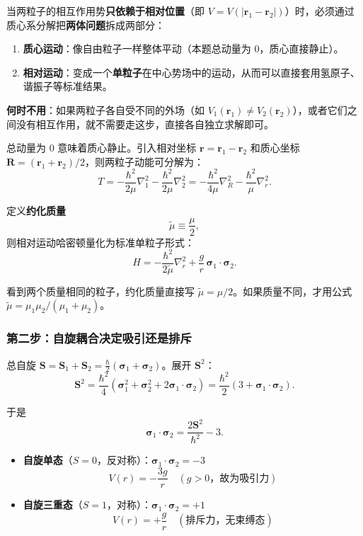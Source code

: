 \begin{insightbox}[什么时候必须用质心系分解？]
当两粒子的相互作用势\textbf{只依赖于相对位置}（即 $V = V(|\bm{r}_1 - \bm{r}_2|)$）时，必须通过质心系分解把\textbf{两体问题}拆成两部分：
\begin{enumerate}[nosep]
    \item \textbf{质心运动}：像自由粒子一样整体平动（本题总动量为 $0$，质心直接静止）。
    \item \textbf{相对运动}：变成一个\textbf{单粒子}在中心势场中的运动，从而可以直接套用氢原子、谐振子等标准结果。
\end{enumerate}
\textbf{何时不用}：如果两粒子各自受不同的外场（如 $V_1(\bm{r}_1) \neq V_2(\bm{r}_2)$），或者它们之间没有相互作用，就不需要走这步，直接各自独立求解即可。
\end{insightbox}

总动量为 $0$ 意味着质心静止。引入相对坐标 $\bm{r} = \bm{r}_1 - \bm{r}_2$ 和质心坐标 $\bm{R} = (\bm{r}_1 + \bm{r}_2)/2$，则两粒子动能可分解为：
\[
T = -\frac{\hbar^2}{2\mu}\nabla_1^2 - \frac{\hbar^2}{2\mu}\nabla_2^2
= -\frac{\hbar^2}{4\mu}\nabla_R^2 - \frac{\hbar^2}{\mu}\nabla_r^2.
\]

定义\textbf{约化质量}
\[
\tilde{\mu} \equiv \frac{\mu}{2},
\]
则相对运动哈密顿量化为标准单粒子形式：
\[
H = -\frac{\hbar^2}{2\tilde{\mu}} \nabla_r^2 + \frac{g}{r} \, \bm{\sigma}_1 \cdot \bm{\sigma}_2.
\]

\begin{tipbox}[考场速记]
看到两个质量相同的粒子，约化质量直接写 $\tilde{\mu}=\mu/2$。如果质量不同，才用公式 $\tilde{\mu}=\mu_1\mu_2/(\mu_1+\mu_2)$。
\end{tipbox}

\subsubsection{第二步：自旋耦合决定吸引还是排斥}

总自旋 $\bm{S} = \bm{S}_1 + \bm{S}_2 = \frac{\hbar}{2}(\bm{\sigma}_1 + \bm{\sigma}_2)$。展开 $\bm{S}^2$：
\[
\bm{S}^2 = \frac{\hbar^2}{4}(\bm{\sigma}_1^2 + \bm{\sigma}_2^2 + 2\bm{\sigma}_1 \cdot \bm{\sigma}_2) = \frac{\hbar^2}{2}(3 + \bm{\sigma}_1 \cdot \bm{\sigma}_2).
\]

于是
\[
\boxed{\bm{\sigma}_1 \cdot \bm{\sigma}_2 = \frac{2\bm{S}^2}{\hbar^2} - 3}.
\]

\begin{itemize}[nosep]
    \item \textbf{自旋单态}（$S=0$，反对称）：$\bm{\sigma}_1 \cdot \bm{\sigma}_2 = -3$
    \[
    V(r) = -\frac{3g}{r} \quad (g>0 \text{，故为吸引力})
    \]
    \item \textbf{自旋三重态}（$S=1$，对称）：$\bm{\sigma}_1 \cdot \bm{\sigma}_2 = +1$
    \[
    V(r) = +\frac{g}{r} \quad (\text{排斥力，无束缚态})
    \]
\end{itemize}

